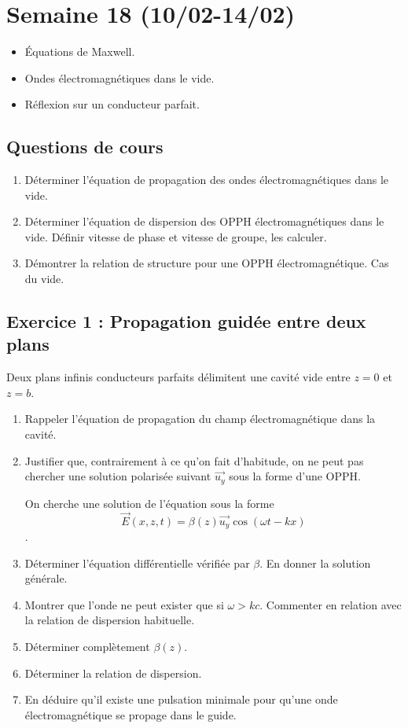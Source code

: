 \section{Semaine 18 (10/02-14/02)}


\begin{itemize}
	\item Équations de Maxwell.
	\item Ondes électromagnétiques dans le vide.
	\item Réflexion sur un conducteur parfait.
\end{itemize}

\subsection{Questions de cours}
\begin{enumerate}
	\item Déterminer l'équation de propagation des ondes électromagnétiques dans le vide.
	\item Déterminer l'équation de dispersion des OPPH électromagnétiques dans le vide. Définir vitesse de phase et vitesse de groupe, les calculer.
	\item Démontrer la relation de structure pour une OPPH électromagnétique. Cas du vide.
\end{enumerate}

\subsection{Exercice 1 : Propagation guidée entre deux plans}

Deux plans infinis conducteurs parfaits délimitent une cavité vide entre $z=0$ et $z=b$. 

\begin{enumerate}
	\item Rappeler l'équation de propagation du champ électromagnétique dans la cavité.
	\item Justifier que, contrairement à ce qu'on fait d'habitude, on ne peut pas chercher une solution polarisée suivant $\vec{u_y}$ sous la forme d'une OPPH.
	
	On cherche une solution de l'équation sous la forme $$\vec{E}(x, z, t) = \beta(z)\vec{u_y}\cos(\omega t - k x)$$.
	
	\item Déterminer l'équation différentielle vérifiée par $\beta$. En donner la solution générale.
	\item Montrer que l'onde ne peut exister que si $\omega > kc$. Commenter en relation avec la relation de dispersion habituelle.
	\item Déterminer complètement $\beta(z)$.
	\item Déterminer la relation de dispersion. 
	\item En déduire qu'il existe une pulsation minimale pour qu'une onde électromagnétique se propage dans le guide.
\end{enumerate}

